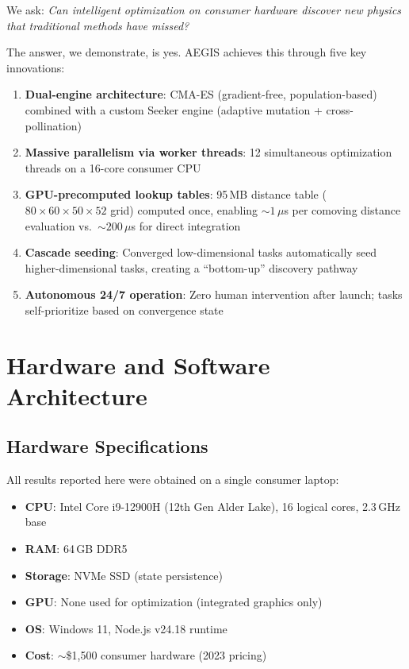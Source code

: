 \documentclass[twocolumn,showpacs,preprintnumbers,amsmath,amssymb,prl]{revtex4-2}
\begin{document}
We ask: \textit{Can intelligent optimization on consumer hardware discover new physics that traditional methods have missed?}

The answer, we demonstrate, is yes. AEGIS achieves this through five key innovations:
\begin{enumerate}
\item \textbf{Dual-engine architecture}: CMA-ES (gradient-free, population-based) combined with a custom Seeker engine (adaptive mutation + cross-pollination)
\item \textbf{Massive parallelism via worker threads}: 12 simultaneous optimization threads on a 16-core consumer CPU
\item \textbf{GPU-precomputed lookup tables}: 95\,MB distance table ($80 \times 60 \times 50 \times 52$ grid) computed once, enabling $\sim 1\,\mu$s per comoving distance evaluation vs.\ $\sim 200\,\mu$s for direct integration
\item \textbf{Cascade seeding}: Converged low-dimensional tasks automatically seed higher-dimensional tasks, creating a ``bottom-up'' discovery pathway
\item \textbf{Autonomous 24/7 operation}: Zero human intervention after launch; tasks self-prioritize based on convergence state
\end{enumerate}

\section{Hardware and Software Architecture}

\subsection{Hardware Specifications}

All results reported here were obtained on a single consumer laptop:
\begin{itemize}
\item \textbf{CPU}: Intel Core i9-12900H (12th Gen Alder Lake), 16 logical cores, 2.3\,GHz base
\item \textbf{RAM}: 64\,GB DDR5 
\item \textbf{Storage}: NVMe SSD (state persistence)
\item \textbf{GPU}: None used for optimization (integrated graphics only)
\item \textbf{OS}: Windows 11, Node.js v24.18 runtime
\item \textbf{Cost}: $\sim$\$1,500 consumer hardware (2023 pricing)
\end{itemize}
\end{document}
